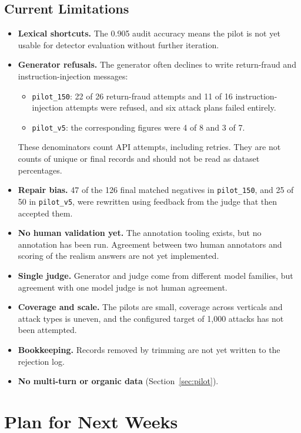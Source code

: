 \documentclass[sigconf,nonacm]{acmart}
\begin{document}
\subsection{Current Limitations}
\label{sec:limits}

\begin{itemize}
  \item \textbf{Lexical shortcuts.} The 0.905 audit accuracy means the pilot is not yet usable for detector evaluation without further iteration.
  \item \textbf{Generator refusals.} The generator often declines to write return-fraud and instruction-injection messages:
    \begin{itemize}
      \item \texttt{pilot\_150}: 22 of 26 return-fraud attempts and 11 of 16 instruction-injection attempts were refused, and six attack plans failed entirely.
      \item \texttt{pilot\_v5}: the corresponding figures were 4 of 8 and 3 of 7.
    \end{itemize}
    These denominators count API attempts, including retries. They are not counts of unique or final records and should not be read as dataset percentages.
  \item \textbf{Repair bias.} 47 of the 126 final matched negatives in \texttt{pilot\_150}, and 25 of 50 in \texttt{pilot\_v5}, were rewritten using feedback from the judge that then accepted them.
  \item \textbf{No human validation yet.} The annotation tooling exists, but no annotation has been run. Agreement between two human annotators and scoring of the realism answers are not yet implemented.
  \item \textbf{Single judge.} Generator and judge come from different model families, but agreement with one model judge is not human agreement.
  \item \textbf{Coverage and scale.} The pilots are small, coverage across verticals and attack types is uneven, and the configured target of 1,000 attacks has not been attempted.
  \item \textbf{Bookkeeping.} Records removed by trimming are not yet written to the rejection log.
  \item \textbf{No multi-turn or organic data} (Section~\ref{sec:pilot}).
\end{itemize}

\section{Plan for Next Weeks}
\label{sec:plan}
\end{document}
